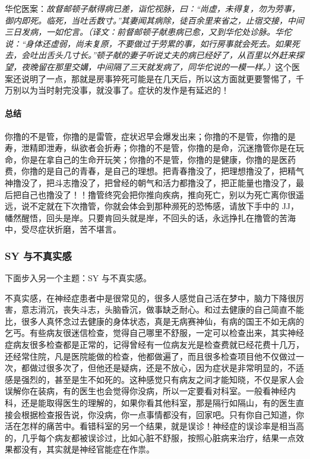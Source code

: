华佗医案：\textit{故督邮顿子献得病已差，诣佗视脉，曰：“尚虚，未得复，勿为劳事，御内即死。临死，当吐舌数寸。”其妻闻其病除，徒百余里来省之，止宿交接，中间三日发病，一如佗言。（译文：前督邮顿子献患病已愈，又到华佗处诊脉。华佗说：“身体还虚弱，尚未复原，不要做过于劳累的事，如行房事就会死去。如果死去，会吐出舌头几寸长。”顿子献的妻子听说丈夫的病已经好了，从百里以外赶来探望，夜晚留在那里交媾，中间隔了三天就发病了，同华佗说的一模一样。）}这个医案还说明了一点，那就是房事猝死可能是在几天后，所以这方面就更要警惕了，千万别以为当时射完没事，就没事了。症状的发作是有延迟的！

\paragraph*{总结}

你撸的不是管，你撸的是雷管，症状迟早会爆发出来；你撸的不是管，你撸的是寿，泄精即泄寿，纵欲者会折寿；你撸的不是管，你撸的是命，沉迷撸管你是在玩命，你是在拿自己的生命开玩笑；你撸的不是管，你撸的是健康，你撸的是医药费，你撸的是自己的青春，是自己的理想。把青春撸没了，把理想撸没了，把精气神撸没了，把斗志撸没了，把曾经的朝气和活力都撸没了，把正能量也撸没了，最后把自己也撸没了！！撸管终究会把你推向疾病，推向死亡，别以为死亡离你很遥远，说不定就在下次撸管，你就会体会到那种濒死的恐怖感，请放下手中的 JJ，幡然醒悟，回头是岸。只要肯回头就是岸，不回头的话，永远挣扎在撸管的苦海中，受尽症状折磨，苦不堪言。

\subsubsection{SY 与不真实感}

下面步入另一个主题：SY 与不真实感。

不真实感，在神经症患者中是很常见的，很多人感觉自己活在梦中，脑力下降很厉害，意志消沉，丧失斗志，头脑昏沉，做事缺乏耐心。和过去健康的自己简直不能比，很多人真怀念过去健康的身体状态，真是无病赛神仙，有病的国王不如无病的乞丐。有些病友很迷信检查，觉得自己哪里不舒服，一定可以检查出来，其实神经症病友很多检查都是正常的，记得曾经有一位病友光是检查费就已经花费十几万，还经常住院，凡是医院能做的检查，他都做遍了，而且很多检查项目他不仅做过一次，都做过很多次了，但他还是疑病，还是不放心，因为症状是非常明显的，不适感是强烈的，甚至是生不如死的。这种感觉只有病友之间才能知晓，不仅是家人会误解你在装病，有的医生也会觉得你没病，所以一定要看对科室。一般看神经内科，还是能取得医生的理解的，如果你看其他科室，那是隔行如隔山，有的医生直接会根据检查报告说，你没病，你一点事情都没有，回家吧。只有你自己知道，你活在怎样的痛苦中。看错科室的另一个结果，就是误诊！神经症的误诊率是相当高的，几乎每个病友都被误诊过，比如心脏不舒服，按照心脏病来治疗，结果一点效果都没有，其实就是神经官能症在作祟。

